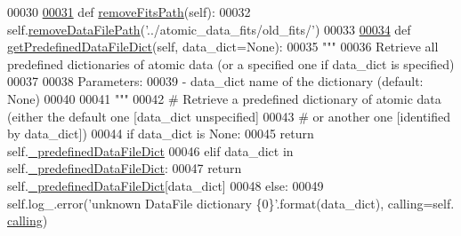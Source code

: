 \begin{DoxyCode}
00030 
\hypertarget{manage__atomic__data_8py_source_l00031}{}\hyperlink{classpyneb_1_1utils_1_1manage__atomic__data_1_1___manage_atomic_data_a9cade6c2f74e46262270c8464c9811d7}{00031}     \textcolor{keyword}{def }\hyperlink{classpyneb_1_1utils_1_1manage__atomic__data_1_1___manage_atomic_data_a9cade6c2f74e46262270c8464c9811d7}{removeFitsPath}(self):
00032         self.\hyperlink{classpyneb_1_1utils_1_1manage__atomic__data_1_1___manage_atomic_data_a058a05e4bc4bb113b7ec44510a1a40f8}{removeDataFilePath}(\textcolor{stringliteral}{'../atomic\_data\_fits/old\_fits/'})
00033         
\hypertarget{manage__atomic__data_8py_source_l00034}{}\hyperlink{classpyneb_1_1utils_1_1manage__atomic__data_1_1___manage_atomic_data_a95c5df20a27033c4c32831d85a1c2876}{00034}     \textcolor{keyword}{def }\hyperlink{classpyneb_1_1utils_1_1manage__atomic__data_1_1___manage_atomic_data_a95c5df20a27033c4c32831d85a1c2876}{getPredefinedDataFileDict}(self, data\_dict=None):
00035         \textcolor{stringliteral}{"""}
00036 \textcolor{stringliteral}{        Retrieve all predefined dictionaries of atomic data (or a specified one if data\_dict is specified)}
00037 \textcolor{stringliteral}{        }
00038 \textcolor{stringliteral}{        Parameters:}
00039 \textcolor{stringliteral}{           - data\_dict    name of the dictionary (default: None)}
00040 \textcolor{stringliteral}{}
00041 \textcolor{stringliteral}{        """}
00042 \textcolor{comment}{#        Retrieve a predefined dictionary of atomic data (either the default one [data\_dict unspecified]}
00043 \textcolor{comment}{#        or another one [identified by data\_dict])}
00044         \textcolor{keywordflow}{if} data\_dict \textcolor{keywordflow}{is} \textcolor{keywordtype}{None}:
00045             \textcolor{keywordflow}{return} self.\hyperlink{classpyneb_1_1utils_1_1manage__atomic__data_1_1___manage_atomic_data_ad9b54bc077170e477f23059e2256b30f}{\_predefinedDataFileDict}
00046         \textcolor{keywordflow}{elif} data\_dict \textcolor{keywordflow}{in} self.\hyperlink{classpyneb_1_1utils_1_1manage__atomic__data_1_1___manage_atomic_data_ad9b54bc077170e477f23059e2256b30f}{\_predefinedDataFileDict}:
00047             \textcolor{keywordflow}{return} self.\hyperlink{classpyneb_1_1utils_1_1manage__atomic__data_1_1___manage_atomic_data_ad9b54bc077170e477f23059e2256b30f}{\_predefinedDataFileDict}[data\_dict]
00048         \textcolor{keywordflow}{else}:
00049             self.log\_.error(\textcolor{stringliteral}{'unknown DataFile dictionary \{0\}'}.format(data\_dict), calling=self.
      \hyperlink{classpyneb_1_1utils_1_1manage__atomic__data_1_1___manage_atomic_data_ab10b91ca784741ce7af163d010802434}{calling})

\end{DoxyCode}
